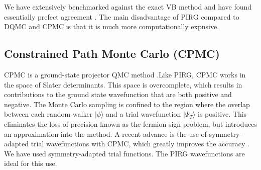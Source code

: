 \documentclass[a4paper,12pt]{article}
\begin{document}
We have extensively benchmarked against the exact VB method and have found essentially prefect agreement \cite{dayal11a}. The main disadvantage 
of PIRG compared to DQMC and CPMC is that it is much more computationally expnsive.

\subsection{Constrained Path Monte Carlo (CPMC)}
CPMC is a ground-state projector QMC method \cite{zhang97a}.Like PIRG, CPMC works in the space of Slater determinants. This space is overcomplete, which results
in contributions to the ground state wavefunction that are both positive and negative. The Monte Carlo
sampling is confined to the region where the overlap between each random walker $|\phi\rangle$ and a trial wavefunction
$|\Psi_{T}\rangle$ is positive. This eliminates the loss of precision known as the fermion sign problem, but
introduces an approximation into the method. A recent advance is the use of symmetry-adapted trial wavefunctions
with CPMC, which greatly improves the accuracy \cite{shi14a}. We have used symmetry-adapted trial functions. 
The PIRG wavefunctions are ideal for this use.

 
\end{document}
